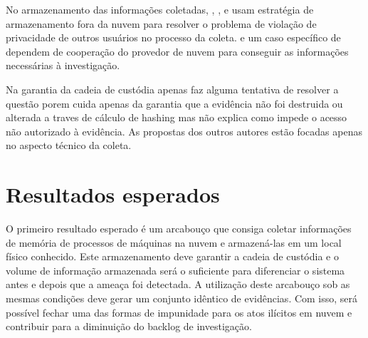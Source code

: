\documentclass[12pt,				%
	openright,			%
	oneside,			%
	a4paper,			%
	english,			%
	brazil				%
	]{abntex2}
\begin{document}
No armazenamento das informações coletadas, \cite{Reichert2015}, \cite{George2012}, \cite{Poisel2013} e \cite{Dykstra2013} usam estratégia de armazenamento fora da nuvem para 
resolver o problema de violação de privacidade de outros usuários no processo da coleta. \cite{Sang2013} e um caso específico de \cite{George2012} dependem de cooperação do 
provedor de nuvem para conseguir as informações necessárias à investigação.

Na garantia da cadeia de custódia apenas \cite{Sang2013} faz alguma tentativa de resolver a questão porem cuida apenas da garantia que a evidência não foi destruida ou alterada a
traves de cálculo de hashing mas não explica como impede o acesso não autorizado à evidência. As propostas dos outros autores estão focadas apenas no aspecto técnico da coleta.

\chapter{Resultados esperados} \label{chap:result}
O primeiro resultado esperado é um arcabouço que consiga coletar informações de memória de processos de máquinas na nuvem e armazená-las em um local físico conhecido.
Este armazenamento deve garantir a cadeia de custódia e o volume de informação armazenada será o suficiente para diferenciar o sistema antes e depois que a ameaça foi 
detectada. A utilização deste arcabouço sob as mesmas condições deve gerar um conjunto idêntico de evidências. Com isso, será possível fechar uma das formas de impunidade 
para os atos ilícitos em nuvem e contribuir para a diminuição do backlog de investigação.



\postextual

%  

\begin{comment}
\printindex
\end{comment}

\end{document}
